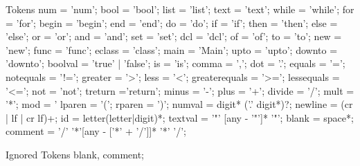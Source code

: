 Tokens \label{Tokens}
    num = 'num';
    bool = 'bool';
    list = 'list';
    text = 'text';
    while = 'while';
    for = 'for';
    begin = 'begin';
    end = 'end';
    do = 'do';
    if = 'if';
    then = 'then';
    else = 'else';
    or = 'or';
    and = 'and';
    set = 'set';
    dcl = 'dcl';
    of = 'of';
    to = 'to';
    new = 'new';
    func = 'func';
    eclass = 'class';
    main = 'Main';
    upto = 'upto';
    downto = 'downto';
    boolval = 'true' | 'false';
    is = 'is';
    comma = ',';
    dot = '.';
    equals = '=';
    notequals = '!=';
    greater = '>';
    less = '<';
    greaterequals = '>=';
    lessequals = '<=';
    not = 'not';
    treturn ='return';
    minus = '-';
    plus = '+';
    divide = '/';
    mult = '*';
    mod = '%
    lparen = '(';
    rparen = ')';
    numval = digit* ('.' digit*)?;
    newline = (cr | lf | cr lf)+;
    id = letter(letter|digit)*;
    textval = '"' [any - '"']* '"';
    blank = space*;
    comment = '/' '*'[any - ['*' + '/']]* '*' '/';

Ignored Tokens
     blank,
     comment;